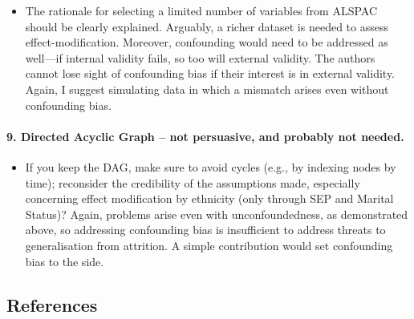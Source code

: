 \documentclass[
  singlecolumn]{article}
\let\oldparagraph\paragraph
\renewcommand{\paragraph}[1]{\oldparagraph{#1}\mbox{}}
\providecommand{\tightlist}{%
  \setlength{\itemsep}{0pt}\setlength{\parskip}{0pt}}\usepackage{longtable,booktabs,array}
\begin{document}
\begin{itemize}
\tightlist
\item
  The rationale for selecting a limited number of variables from ALSPAC
  should be clearly explained. Arguably, a richer dataset is needed to
  assess effect-modification. Moreover, confounding would need to be
  addressed as well---if internal validity fails, so too will external
  validity. The authors cannot lose sight of confounding bias if their
  interest is in external validity. Again, I suggest simulating data in
  which a mismatch arises even without confounding bias.
\end{itemize}

\paragraph{9. Directed Acyclic Graph -- not persuasive, and probably not
needed.}\label{directed-acyclic-graph-not-persuasive-and-probably-not-needed.}

\begin{itemize}
\tightlist
\item
  If you keep the DAG, make sure to avoid cycles (e.g., by indexing
  nodes by time); reconsider the credibility of the assumptions made,
  especially concerning effect modification by ethnicity (only through
  SEP and Marital Status)? Again, problems arise even with
  unconfoundedness, as demonstrated above, so addressing confounding
  bias is insufficient to address threats to generalisation from
  attrition. A simple contribution would set confounding bias to the
  side.
\end{itemize}

\subsection*{References}\label{references}
\end{document}
